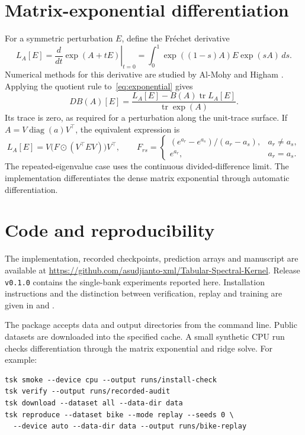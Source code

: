 \documentclass[11pt]{article}
\newcommand{\tr}{\operatorname{tr}}
\begin{document}
\section{Matrix-exponential differentiation}\label{app:derivative}
For a symmetric perturbation $E$, define the Fr\'echet derivative
\begin{equation}
 L_A[E]=\left.\frac{d}{dt}\exp(A+tE)\right|_{t=0}
       =\int_0^1\exp((1-s)A)E\exp(sA)\,ds.
\end{equation}
Numerical methods for this derivative are studied by Al-Mohy and Higham \cite{almohy2009}. Applying the quotient rule to~\eqref{eq:exponential} gives
\begin{equation}
 DB(A)[E]=\frac{L_A[E]-B(A)\tr L_A[E]}{\tr\exp(A)}.
\end{equation}
Its trace is zero, as required for a perturbation along the unit-trace surface. If $A=V\operatorname{diag}(a)V^\top$, the equivalent expression is
\begin{equation}
 L_A[E]=V\bigl(F\odot(V^\top EV)\bigr)V^\top,\qquad
 F_{rs}=\begin{cases}
 (e^{a_r}-e^{a_s})/(a_r-a_s),&a_r\ne a_s,\\
 e^{a_r},&a_r=a_s.
 \end{cases}
\end{equation}
The repeated-eigenvalue case uses the continuous divided-difference limit. The implementation differentiates the dense matrix exponential through automatic differentiation.

\section{Code and reproducibility}\label{app:repro}
The implementation, recorded checkpoints, prediction arrays and manuscript are available at \url{https://github.com/asudjianto-xml/Tabular-Spectral-Kernel}. Release \texttt{v0.1.0} contains the single-bank experiments reported here. Installation instructions and the distinction between verification, replay and training are given in  and .

The package accepts data and output directories from the command line. Public datasets are downloaded into the specified cache. A small synthetic CPU run checks differentiation through the matrix exponential and ridge solve. For example:
\begin{verbatim}
tsk smoke --device cpu --output runs/install-check
tsk verify --output runs/recorded-audit
tsk download --dataset all --data-dir data
tsk reproduce --dataset bike --mode replay --seeds 0 \
  --device auto --data-dir data --output runs/bike-replay
\end{verbatim}
\end{document}
